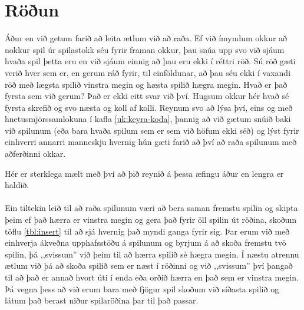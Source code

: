 \section{Röðun}\label{uk:reiknirit-röðun}
Áður en við getum farið að leita ætlum við að raða.
Ef við ímyndum okkur að nokkur spil úr spilastokk séu fyrir framan okkur, þau snúa upp svo við sjáum hvaða spil þetta eru en við sjáum einnig að þau eru ekki í réttri röð.
Sú röð gæti verið hver sem er, en gerum ráð fyrir, til einföldunar, að þau séu ekki í vaxandi röð með lægsta spilið vinstra megin og hæsta spilið hægra megin.
Hvað er það fyrsta sem við gerum?
Það er ekki eitt svar við því.
Hugsum okkur hér hvað sé fyrsta skrefið og svo næsta og koll af kolli.
Reynum svo að lýsa því, eins og með hnetusmjörssamlokuna í kafla \ref{uk:keyra-koda}, þannig að við gætum snúið baki við spilunum (eða bara hvaða spilum sem er sem við höfum ekki séð) og lýst fyrir einhverri annarri manneskju hvernig hún gæti farið að því að raða spilunum með aðferðinni okkar.

Hér er sterklega mælt með því að þið reynið á þessa æfingu áður en lengra er haldið.

\paragraph{}
Ein tiltekin leið til að raða spilunum væri að bera saman fremstu spilin og skipta þeim ef það hærra er vinstra megin og gera það fyrir öll spilin út röðina, skoðum töflu \ref{tbl:insert} til að sjá hvernig það myndi ganga fyrir sig.
Þar erum við með einhverja ákveðna upphafsstöðu á spilunum og byrjum á að skoða fremstu tvö spilin, þá ,,svissum'' við þeim til að hærra spilið sé hægra megin.
Í næstu atrennu ætlum við þá að skoða spilið sem er næst í röðinni og við ,,svissum'' því þangað til að það er annað hvort úti í enda eða orðið hærra en það sem er vinstra megin.
Þá vegna þess að við erum bara með fjögur spil skoðum við síðasta spilið og látum það berast niður spilaröðina þar til það passar.


